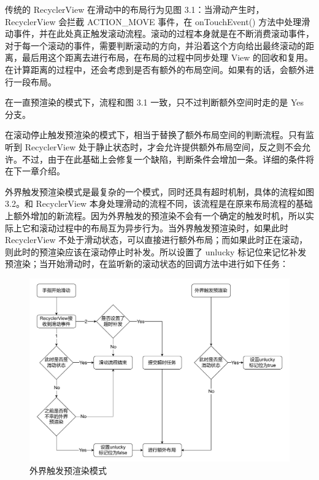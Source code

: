传统的 RecyclerView 在滑动中的布局行为见图 3.1：当滑动产生时，RecyclerView 会拦截 ACTION\_MOVE 事件，在 onTouchEvent() 方法中处理滑动事件，并在此处真正触发滚动流程。滚动的过程本身就是在不断消费滚动事件，对于每一个滚动的事件，需要判断滚动的方向，并沿着这个方向给出最终滚动的距离，最后用这个距离去进行布局，在布局的过程中同步处理 View 的回收和复用。在计算距离的过程中，还会考虑到是否有额外的布局空间。如果有的话，会额外进行一段布局。



在一直预渲染的模式下，流程和图 3.1 一致，只不过判断额外空间时走的是 Yes 分支。

在滚动停止触发预渲染的模式下，相当于替换了额外布局空间的判断流程。只有监听到 RecyclerView 处于静止状态时，才会允许提供额外布局空间，反之则不会允许。不过，由于在此基础上会修复一个缺陷，判断条件会增加一条。详细的条件将在下一章介绍。

外界触发预渲染模式是最复杂的一个模式，同时还具有超时机制，具体的流程如图 3.2。和 RecyclerView 本身处理滑动的流程不同，该流程是在原来布局流程的基础上额外增加的新流程。因为外界触发的预渲染不会有一个确定的触发时机，所以实际上它和滚动过程中的布局互为异步行为。当外界触发预渲染时，如果此时 RecyclerView 不处于滑动状态，可以直接进行额外布局；而如果此时正在滚动，则此时的预渲染应该在滚动停止时补发。所以设置了 unlucky 标记位来记忆补发预渲染；当开始滑动时，在监听新的滚动状态的回调方法中进行如下任务：

% 

\begin{figure}
    \centering
    \begin{adjustbox}{max width=\textwidth}
        \includegraphics{assets/preload-outside.pdf}
    \end{adjustbox}
    \caption{外界触发预渲染模式}
\end{figure}

